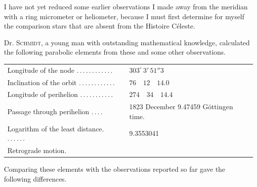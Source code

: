 I have not yet reduced some earlier observations I made away from the meridian with a ring micrometer or heliometer, because I must first determine for myself the comparison stars that are absent from the Histoire Céleste.

Dr. \textsc{Schmidt}, a young man with outstanding mathematical knowledge, calculated the following parabolic elements from these and some other observations.

\begin{center}
\begingroup\small
\begin{tabular}{p{.51\linewidth}p{.41\linewidth}}
Longitude of the node \mbox{.\,.\,.\,.\,.\,.\,.\,.\,.\,.\,.\,.} & $303^\circ\,3'\,51''3$ \\
Inclination of the orbit \mbox{.\,.\,.\,.\,.\,.\,.\,.\,.\,.\,.\,.} & $76\quad12\quad14.0$ \\
Longitude of perihelion \mbox{.\,.\,.\,.\,.\,.\,.\,.\,.\,.\,.} & $274\quad34\quad14.4$ \\
Passage through perihelion \mbox{.\,.\,.\,.} & 1823 December 9.47459 Göttingen time. \\
Logarithm of the least distance. \mbox{.\,.\,.\,.\,.\,.} & 9.3553041 \\
\multicolumn{2}{l}{Retrograde motion.} \\
\end{tabular}
\endgroup
\end{center}

Comparing these elements with the observations reported so far gave the following differences.



